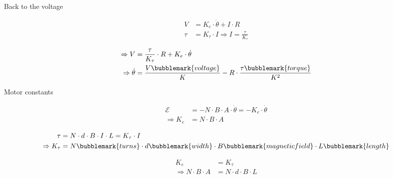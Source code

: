\documentclass[compress]{beamer}
\begin{document}
\begin{frame}{Back to the voltage}


\begin{align*}
    V &= K_e \cdot \dot\theta + I \cdot R \\
    \tau &= K_\tau \cdot I \Rightarrow I = \frac{\tau}{K_\tau}
\end{align*}

\Large
\begin{equation*}
\begin{split}
    \Rightarrow V &= \frac{\tau}{K_\tau} \cdot R + K_e \cdot \dot\theta \\
    \Rightarrow \dot\theta &= \frac{V\bubblemark{voltage}}{K} - R \cdot \frac{\tau\bubblemark{torque}}{K^2}
\end{split}
\end{equation*}

\end{frame}


\begin{frame}{Motor constants}

\begin{align*}
    \mathcal{E} &= - N \cdot B \cdot A \cdot \dot\theta = - K_e \cdot \dot\theta \\
    \Rightarrow K_e &= N \cdot B \cdot A
\end{align*}

\begin{align*}
    \tau &= N \cdot d \cdot B \cdot I \cdot L = K_\tau \cdot I \\
    \Rightarrow K_\tau &= N\bubblemark{turns} \cdot d\bubblemark{width} \cdot B\bubblemark{magneticfield} \cdot L\bubblemark{length}
\end{align*}


\pause

\begin{align*}
    K_e &= K_\tau \\
    \Rightarrow N \cdot B \cdot A &= N \cdot d \cdot B \cdot L
\end{align*}

\end{frame}
\end{document}
